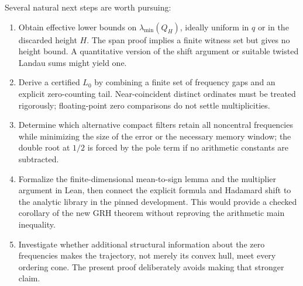 \documentclass[11pt]{article}
\begin{document}
Several natural next steps are worth pursuing:
\begin{enumerate}
 \item Obtain effective lower bounds on $\lambda_{\min}(Q_H)$, ideally uniform in $q$ or in the discarded height $H$. The span proof implies a finite witness set but gives no height bound. A quantitative version of the shift argument or suitable twisted Landau sums might yield one.
 \item Derive a certified $L_0$ by combining a finite set of frequency gaps and an explicit zero-counting tail. Near-coincident distinct ordinates must be treated rigorously; floating-point zero comparisons do not settle multiplicities.
 \item Determine which alternative compact filters retain all noncentral frequencies while minimizing the size of the error or the necessary memory window; the double root at $1/2$ is forced by the pole term if no arithmetic constants are subtracted.
 \item Formalize the finite-dimensional mean-to-sign lemma and the multiplier argument in Lean, then connect the explicit formula and Hadamard shift to the analytic library in the pinned development. This would provide a checked corollary of the new GRH theorem without reproving the arithmetic main inequality.
 \item Investigate whether additional structural information about the zero frequencies makes the trajectory, not merely its convex hull, meet every ordering cone. The present proof deliberately avoids making that stronger claim.
\end{enumerate}
\end{document}
